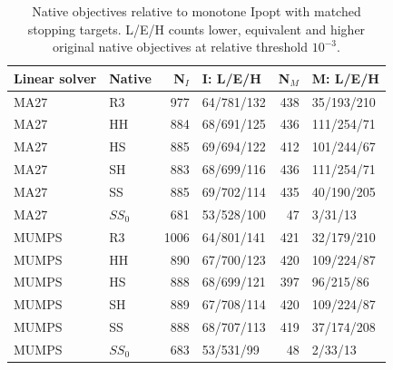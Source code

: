 \documentclass[pdflatex,sn-mathphys-num]{sn-jnl}
\theoremstyle{thmstyleone}
\theoremstyle{thmstylethree}
\begin{document}
\begin{table}[!htbp]
\centering\footnotesize
\caption{Native objectives relative to monotone Ipopt with matched
stopping targets. L/E/H counts lower, equivalent and higher original
native objectives at relative threshold $10^{-3}$.}
\label{tab:aligned-objective-thresholds}

\begin{tabular}{@{}llrlrl@{}}
\toprule
Linear solver & Native & N$_I$ & I: L/E/H & N$_M$ & M: L/E/H\\
\midrule
MA27 & R3 & 977 & 64/781/132 & 438 & 35/193/210\\
MA27 & HH & 884 & 68/691/125 & 436 & 111/254/71\\
MA27 & HS & 885 & 69/694/122 & 412 & 101/244/67\\
MA27 & SH & 883 & 68/699/116 & 436 & 111/254/71\\
MA27 & SS & 885 & 69/702/114 & 435 & 40/190/205\\
MA27 & $SS_0$ & 681 & 53/528/100 & 47 & 3/31/13\\
MUMPS & R3 & 1006 & 64/801/141 & 421 & 32/179/210\\
MUMPS & HH & 890 & 67/700/123 & 420 & 109/224/87\\
MUMPS & HS & 888 & 68/699/121 & 397 & 96/215/86\\
MUMPS & SH & 889 & 67/708/114 & 420 & 109/224/87\\
MUMPS & SS & 888 & 68/707/113 & 419 & 37/174/208\\
MUMPS & $SS_0$ & 683 & 53/531/99 & 48 & 2/33/13\\
\bottomrule
\end{tabular}


\end{table}
\end{document}
